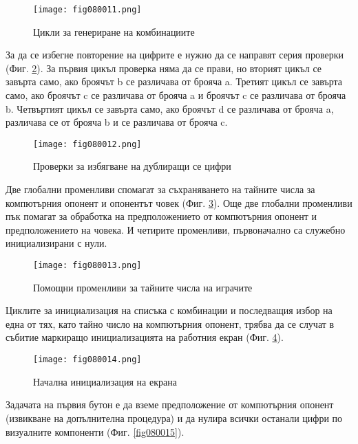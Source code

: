 \begin{figure}[H]
  \centering
  \texttt{[image: fig080011.png]}
  \caption{Цикли за генериране на комбинациите}
\label{fig080011}
\end{figure}

За да се избегне повторение на цифрите е нужно да се направят серия проверки (Фиг. \ref{fig080012}). За първия цикъл проверка няма да се прави, но вторият цикъл се завърта само, ако броячът b се различава от брояча a. Третият цикъл се завърта само, ако броячът c се различава от брояча a и броячът c се различава от брояча b. Четвъртият цикъл се завърта само, ако броячът d се различава от брояча a, различава се от брояча b и се различава от брояча c. 

\begin{figure}[H]
  \centering
  \texttt{[image: fig080012.png]}
  \caption{Проверки за избягване на дублиращи се цифри}
\label{fig080012}
\end{figure}

Две глобални променливи спомагат за съхраняването на тайните числа за компютърния опонент и опонентът човек (Фиг. \ref{fig080013}). Още две глобални променливи пък помагат за обработка на предположението от компютърния опонент и предположението на човека. И четирите променливи, първоначално са служебно инициализирани с нули.

\begin{figure}[H]
  \centering
  \texttt{[image: fig080013.png]}
  \caption{Помощни променливи за тайните числа на играчите}
\label{fig080013}
\end{figure}

Циклите за инициализация на списъка с комбинации и последващия избор на една от тях, като тайно число на компютърния опонент, трябва да се случат в събитие маркиращо инициализацията на работния екран (Фиг. \ref{fig080014}).

\begin{figure}[H]
  \centering
  \texttt{[image: fig080014.png]}
  \caption{Начална инициализация на екрана}
\label{fig080014}
\end{figure}

Задачата на първия бутон е да вземе предположение от компютърния опонент (извикване на допълнителна процедура) и да нулира всички останали цифри по визуалните компоненти (Фиг. \ref{fig080015}).

